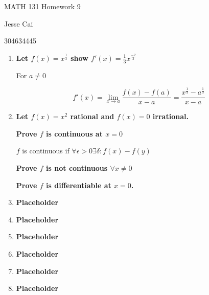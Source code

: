 \documentclass[10pt,a4paper]{article}
\begin{document}
 
MATH 131 Homework 9

Jesse Cai

304634445

\begin{enumerate}
    \item \textbf{Let $f(x) = x^{\frac{1}{3}}$ show $f'(x) = \frac{1}{3}x^\frac{-2}{3}$}

        For $a \neq 0$ 

        $$f'(x) = \lim_{x \to a} \frac{f(x) - f(a)}{x - a } = \frac{x^{\frac{1}{3}} - a^{\frac{1}{3}}}{x - a}$$

    \item \textbf{Let $f(x)=x^2$ rational and $f(x)=0$ irrational.}

    \textbf{ Prove $f$ is continuous at $x = 0$}

        $f$ is continuous if $\forall \epsilon > 0 \exists \delta: f(x) - f(y)$

    \textbf{ Prove $f$ is not continuous $\forall x \neq 0$}

    \textbf{ Prove $f$ is differentiable at $x = 0$.}
    
    \item \textbf{Placeholder}
    \item \textbf{Placeholder}
    \item \textbf{Placeholder}
    \item \textbf{Placeholder}
    \item \textbf{Placeholder}
    \item \textbf{Placeholder}

\end{enumerate}
\end{document}
